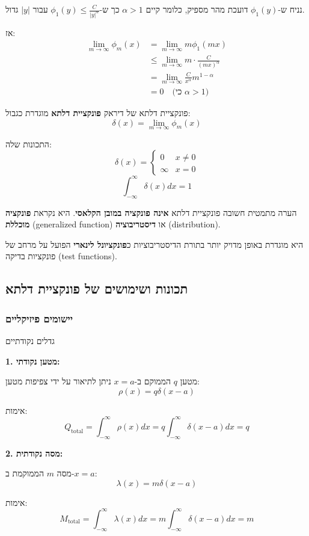 \documentclass{article}
\begin{document}
נניח ש-$\phi_1(y)$ דועכת מהר מספיק, כלומר קיים $\alpha > 1$ כך ש-$\phi_1(y) \leq \frac{C}{|y|^\alpha}$ עבור $|y|$ גדול.

אז:
\begin{align*}
\lim_{m\to\infty}\phi_m(x) &= \lim_{m\to\infty}m\phi_1(mx) \\
&\leq \lim_{m\to\infty}m \cdot \frac{C}{(mx)^\alpha} \\
&= \lim_{m\to\infty}\frac{C}{x^\alpha} m^{1-\alpha} \\
&= 0 \quad \text{(כי $\alpha > 1$)}
\end{align*}


\begin{definitionbox}{פונקציית דלתא של דיראק}
\textbf{פונקציית דלתא} מוגדרת כגבול:
\[
\delta(x) = \lim_{m\to\infty}\phi_m(x)
\]

התכונות שלה:
\[
\delta(x) = \begin{cases}
0 & x \neq 0 \\
\infty & x = 0
\end{cases}
\]
\[
\int_{-\infty}^{\infty}\delta(x)dx = 1
\]
\end{definitionbox}

\begin{notebox}{הערה מתמטית חשובה}
פונקציית דלתא \textbf{אינה פונקציה במובן הקלאסי}. היא נקראת \textbf{פונקציה מוכללת} (generalized function) או \textbf{דיסטריבוציה} (distribution). 

היא מוגדרת באופן מדויק יותר בתורת הדיסטריבוציות כ\textbf{פונקציונל לינארי} הפועל על מרחב של פונקציות בדיקה (test functions).
\end{notebox}

\subsection{תכונות ושימושים של פונקציית דלתא}

\subsubsection*{יישומים פיזיקליים}

\begin{examplebox}{גדלים נקודתיים}

\textbf{1. מטען נקודתי:}

מטען $q$ הממוקם ב-$x = a$ ניתן לתיאור על ידי צפיפות מטען:
\[
\rho(x) = q\delta(x - a)
\]

אימות:
\[
Q_{\text{total}} = \int_{-\infty}^{\infty}\rho(x)dx = q\int_{-\infty}^{\infty}\delta(x-a)dx = q
\]

\textbf{2. מסה נקודתית:}

מסה $m$ הממוקמת ב-$x = a$:
\[
\lambda(x) = m\delta(x - a)
\]

אימות:
\[
M_{\text{total}} = \int_{-\infty}^{\infty}\lambda(x)dx = m\int_{-\infty}^{\infty}\delta(x-a)dx = m
\]
\end{examplebox}
\end{document}
